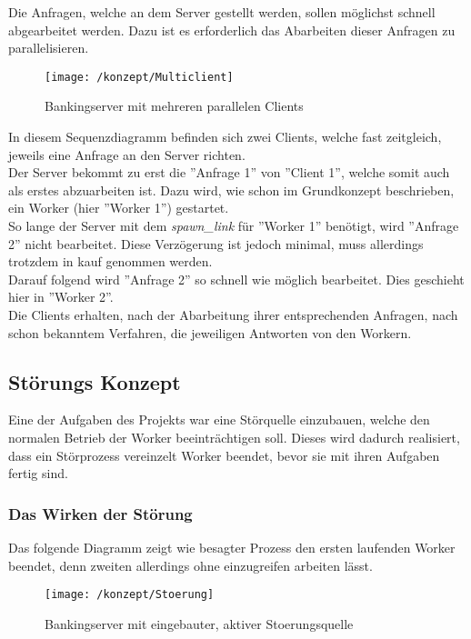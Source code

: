 Die Anfragen, welche an dem Server gestellt werden, sollen möglichst schnell abgearbeitet werden. Dazu ist es erforderlich das Abarbeiten dieser Anfragen zu parallelisieren.

\begin{figure}
\centering
\texttt{[image: /konzept/Multiclient]}
\caption{Bankingserver mit mehreren parallelen Clients}
\label{fig:multiclient}
\end{figure}

In diesem Sequenzdiagramm befinden sich zwei Clients, welche fast zeitgleich, jeweils eine Anfrage an den Server richten.\\
Der Server bekommt zu erst die ''Anfrage 1'' von ''Client 1'', welche somit auch als erstes abzuarbeiten ist. Dazu wird, wie schon im Grundkonzept beschrieben, ein Worker (hier ''Worker 1'') gestartet.\\
So lange der Server mit dem \textit{spawn\_link} für ''Worker 1'' benötigt, wird ''Anfrage 2'' nicht bearbeitet. Diese Verzögerung ist jedoch minimal, muss allerdings trotzdem in kauf genommen werden.\\
Darauf folgend wird ''Anfrage 2'' so schnell wie möglich bearbeitet. Dies geschieht hier in ''Worker 2''.\\
Die Clients erhalten, nach der Abarbeitung ihrer entsprechenden Anfragen, nach schon bekanntem Verfahren, die jeweiligen Antworten von den Workern.

\subsection{Störungs Konzept}

Eine der Aufgaben des Projekts war eine Störquelle einzubauen, welche den normalen Betrieb der Worker beeinträchtigen soll. Dieses wird dadurch realisiert, dass ein Störprozess vereinzelt Worker beendet, bevor sie mit ihren Aufgaben fertig sind.\\

\subsubsection{Das Wirken der Störung}

Das folgende Diagramm zeigt wie besagter Prozess den ersten laufenden Worker beendet, denn zweiten allerdings ohne einzugreifen arbeiten lässt.\\

\begin{figure}
\centering
\texttt{[image: /konzept/Stoerung]}
\caption{Bankingserver mit eingebauter, aktiver Stoerungsquelle}
\label{fig:stoerung}
\end{figure}

